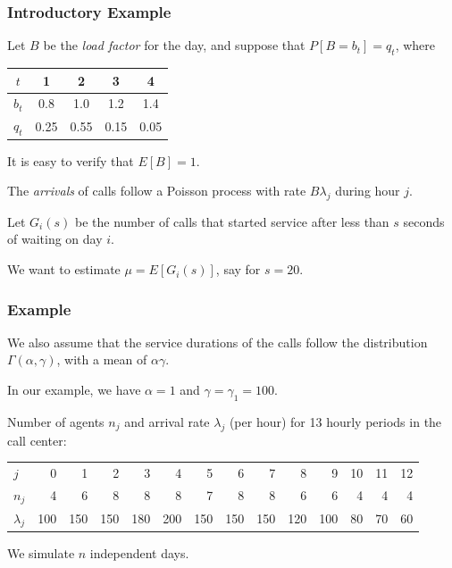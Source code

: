 \documentclass[t,usepdftitle=false]{beamer}
\begin{document}
\begin{frame}
	\frametitle{Introductory Example}
	
	Let \(B\) be the \emph{load factor} for the day, and suppose that \(P[B = b_t] = q_t\), where
	\begin{center}
		\begin{tabular}{c|cccc}
			${t}$   &   1  &  2   &   3  &  4  \\  
			\hline
			${b_t}$ &  0.8 &  1.0 &  1.2 &  1.4 \\
			${q_t}$ & 0.25 & 0.55 & 0.15 & 0.05 \\
		\end{tabular}
	\end{center}
	
	\mbox{}
	
	It is easy to verify that \(E[B] = 1\). %
	
	\mbox{}
	
	The \emph{arrivals} of calls follow a Poisson process with rate
	\(B{\lambda_j}\) during hour \(j\).
	
	\mbox{}
	
	Let \(G_i(s)\) be the number of calls that started service
	after less than \(s\) seconds of waiting on day \(i\).
	
	\mbox{}
	
	We want to estimate \(\mu = E[G_i(s)]\), say for \(s=20\).
	
\end{frame}

\begin{frame}
	\frametitle{Example}
	
	We also assume that the service durations of the calls follow the distribution 
	\(\Gamma(\alpha,\gamma)\), with a mean of \(\alpha\gamma\).
	
	\mbox{}
	
	In our example, we have \(\alpha = 1\) and \(\gamma = {\gamma_1} = 100\).
	
	\mbox{}
	
	Number of agents \(n_j\) and arrival rate \(\lambda_j\) (per hour) for 13 hourly periods in the call center:
	
	\begin{footnotesize}
		\hspace*{-1cm}
		\begin{tabular}{l|rrrrrrrrrrrrr}
			\hline
			$j$   & 0 & 1 & 2 & 3 & 4 & 5 & 6 & 7 & 8 & 9 & 10 & 11 & 12 \\
			$n_j$ & 4 & 6 & 8 & 8 & 8 & 7 & 8 & 8 & 6 &  6 &  4 &  4 &  4 \\
			$\lambda_j$ & 100 & 150 & 150 & 180 & 200 & 150 & 150 & 150 & 
			120 & 100 & 80 & 70 & 60 \\
			\hline
		\end{tabular}
	\end{footnotesize}
	
	\mbox{}
	
	We simulate \(n\) independent days.
	
\end{frame}
\end{document}

